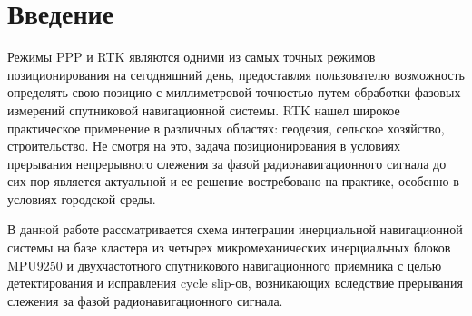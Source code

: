 \section {Введение}


Режимы PPP и RTK являются одними из самых точных режимов позиционирования на сегодняшний день, предоставляя пользователю возможность
определять свою позицию с миллиметровой точностью путем обработки фазовых измерений спутниковой навигационной системы. 
RTK нашел широкое практическое применение в различных областях: геодезия, сельское хозяйство, строительство. Не смотря на это, задача 
позиционирования в условиях прерывания непрерывного слежения за фазой радионавигационного сигнала до сих пор является актуальной и ее 
решение востребовано на практике, особенно в условиях городской среды. 


В данной работе рассматривается схема интеграции инерциальной навигационной системы на базе кластера
из четырех микромеханических инерциальных блоков MPU9250 и двухчастотного спутникового навигационного приемника с целью детектирования и 
исправления cycle slip-ов, возникающих вследствие прерывания слежения за фазой радионавигационного сигнала. 
 
